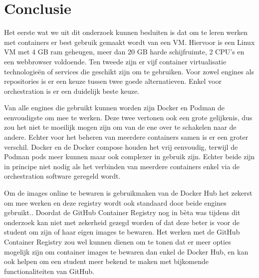 
\chapter{Conclusie}
\label{ch:conclusie}

Het eerste wat we uit dit onderzoek kunnen besluiten is dat om te leren werken met containers er best gebruik gemaakt wordt van een VM. Hiervoor is een Linux VM met 4 GB ram geheugen, meer dan 20 GB harde schijfruimte, 2 CPU’s en een webbrowser voldoende. Ten tweede zijn er vijf container virtualisatie technologieën of services die geschikt zijn om te gebruiken. Voor zowel engines als repositories is er een keuze tussen twee goede alternatieven. Enkel voor orchestration is er een duidelijk beste keuze. 

Van alle engines die gebruikt kunnen worden zijn Docker en Podman de eenvoudigste om mee te werken. Deze twee vertonen ook een grote gelijkenis, dus zou het niet te moeilijk mogen zijn om van de ene over te schakelen naar de andere. Echter voor het beheren van meerdere containers samen is er een groter verschil. Docker en de Docker compose houden het vrij eenvoudig, terwijl de Podman pods meer kunnen maar ook complexer in gebruik zijn. Echter beide zijn in principe niet nodig als het verbinden van meerdere containers enkel via de orchestration software geregeld wordt.

Om de images online te bewaren is gebruikmaken van de Docker Hub het zekerst om mee werken en deze registry wordt ook standaard door beide engines gebruikt.. Doordat de GitHub Container Registry nog in bèta was tijdens dit onderzoek kan niet met zekerheid gezegd worden of dat deze beter is voor de student om zijn of haar eigen images te bewaren. Het werken met de GitHub Container Registry zou wel kunnen dienen om te tonen dat er meer opties mogelijk zijn om container images te bewaren dan enkel de Docker Hub, en kan ook helpen om een student meer bekend te maken met bijkomende functionaliteiten van GitHub. 

